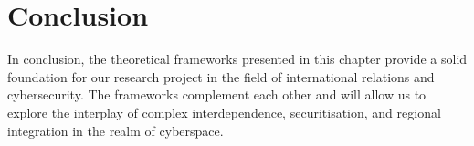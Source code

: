 \section{Conclusion}

In conclusion, the theoretical frameworks presented in this chapter provide a solid foundation for our research project in the field of international relations and cybersecurity. The frameworks complement each other and will allow us to explore the interplay of complex interdependence, securitisation, and regional integration in the realm of cyberspace.